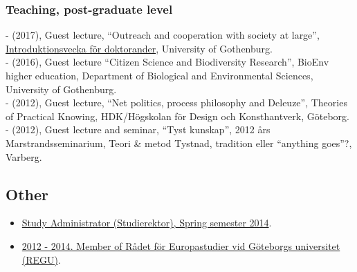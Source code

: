 \documentclass[a4paper,11pt,oneside]{article}
\begin{document}
    \subsubsection{Teaching, post-graduate level}
    - (2017), Guest lecture, ``Outreach and cooperation with society at large'', \href{http://hum.gu.se/utbildning/forskarniva/introduktionsvecka-for-doktorander-2017}{Introduktionsvecka för doktorander}, University of Gothenburg.\\
    - (2016), Guest lecture ``Citizen Science and Biodiversity Research'', BioEnv higher education, Department of Biological and Environmental Sciences, University of Gothenburg.\\
    - (2012), Guest lecture, ``Net politics, process philosophy and Deleuze'', Theories of Practical Knowing, HDK/Högskolan för Design och Konsthantverk, Göteborg.\\
    - (2012), Guest lecture and seminar, ``Tyst kunskap'', 2012 års Marstrandsseminarium, Teori \& metod Tystnad, tradition eller ``anything goes''?, Varberg.\\






        \subsection{Other}
          \begin{itemize}
            \item \href{http://files.christopherkullenberg.se/studierektoronline.pdf}{Study Administrator (Studierektor), Spring semester 2014}. %
            \item \href{http://files.christopherkullenberg.se/IntygREGU.pdf}{2012 - 2014. Member of Rådet för Europastudier vid Göteborgs universitet (REGU)}. %
          \end{itemize}
\end{document}

